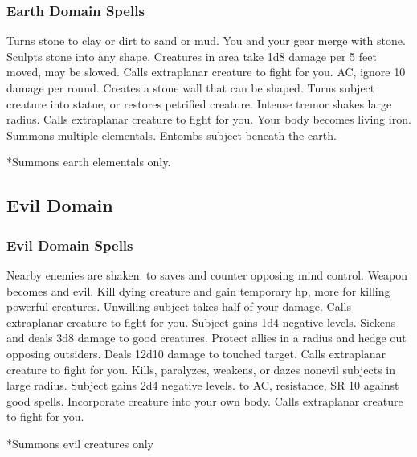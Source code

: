 \subsubsection{Earth Domain Spells}
\begin{spelllist}
\spellhead[1]{}
\spellhead[1]{}
\spellhead[2]{}
 Turns stone to clay or dirt to sand or mud.
 You and your gear merge with stone.
 Sculpts stone into any shape.
 Creatures in area take 1d8 damage per 5 feet moved, may be slowed.
 Calls extraplanar creature to fight for you.
  AC, ignore 10 damage per round.
 Creates a stone wall that can be shaped.
 Turns subject creature into statue, or restores petrified creature.
 Intense tremor shakes large radius.
 Calls extraplanar creature to fight for you.
 Your body becomes living iron.
\spellhead[8]{}
 Summons multiple elementals.
 Entombs subject beneath the earth.
\end{spelllist}
*Summons earth elementals only.

\subsection{Evil Domain}

\subsubsection{Evil Domain Spells}
\begin{spelllist}
 Nearby enemies are shaken.
  to saves and counter opposing mind control.
 Weapon becomes  and evil.
 Kill dying creature and gain temporary hp, more for killing powerful creatures.
 Unwilling subject takes half of your damage.
 Calls extraplanar creature to fight for you.
 Subject gains 1d4 negative levels.
 Sickens and deals 3d8 damage to good creatures.
\spellhead[5]{}
 Protect allies in a \areamed radius and hedge out opposing outsiders.
 Deals 12d10 damage to touched target.
 Calls extraplanar creature to fight for you.
 Kills, paralyzes, weakens, or dazes nonevil subjects in large radius.
\spellhead[7]{}
 Subject gains 2d4 negative levels.
\F {} to AC,  resistance, SR 10 against good spells.
 Incorporate creature into your own body.
 Calls extraplanar creature to fight for you.
\end{spelllist}
*Summons evil creatures only

